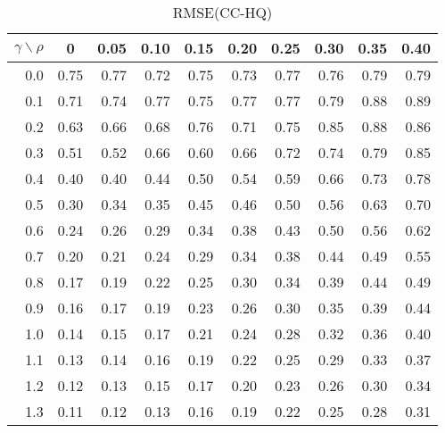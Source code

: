 \documentclass[12pt]{article}
\begin{document}
%
\begin{table}[!tbp]
\caption{RMSE(CC-HQ)}
 \begin{center}
 \begin{tabular}{r|rrrrrrrrr}\hline\hline
\multicolumn{1}{c|}{$\gamma\backslash\rho$}&\multicolumn{1}{c}{0}&\multicolumn{1}{c}{0.05}&\multicolumn{1}{c}{0.10}&\multicolumn{1}{c}{0.15}&\multicolumn{1}{c}{0.20}&\multicolumn{1}{c}{0.25}&\multicolumn{1}{c}{0.30}&\multicolumn{1}{c}{0.35}&\multicolumn{1}{c}{0.40}\tabularnewline
\hline

0.0&0.75&0.77&0.72&0.75&0.73&0.77&0.76&0.79&0.79\tabularnewline
0.1&0.71&0.74&0.77&0.75&0.77&0.77&0.79&0.88&0.89\tabularnewline
0.2&0.63&0.66&0.68&0.76&0.71&0.75&0.85&0.88&0.86\tabularnewline
0.3&0.51&0.52&0.66&0.60&0.66&0.72&0.74&0.79&0.85\tabularnewline
0.4&0.40&0.40&0.44&0.50&0.54&0.59&0.66&0.73&0.78\tabularnewline
0.5&0.30&0.34&0.35&0.45&0.46&0.50&0.56&0.63&0.70\tabularnewline
0.6&0.24&0.26&0.29&0.34&0.38&0.43&0.50&0.56&0.62\tabularnewline
0.7&0.20&0.21&0.24&0.29&0.34&0.38&0.44&0.49&0.55\tabularnewline
0.8&0.17&0.19&0.22&0.25&0.30&0.34&0.39&0.44&0.49\tabularnewline
0.9&0.16&0.17&0.19&0.23&0.26&0.30&0.35&0.39&0.44\tabularnewline
1.0&0.14&0.15&0.17&0.21&0.24&0.28&0.32&0.36&0.40\tabularnewline
1.1&0.13&0.14&0.16&0.19&0.22&0.25&0.29&0.33&0.37\tabularnewline
1.2&0.12&0.13&0.15&0.17&0.20&0.23&0.26&0.30&0.34\tabularnewline
1.3&0.11&0.12&0.13&0.16&0.19&0.22&0.25&0.28&0.31\tabularnewline
\hline
\end{tabular}

\end{center}

\end{table}
\end{document}
